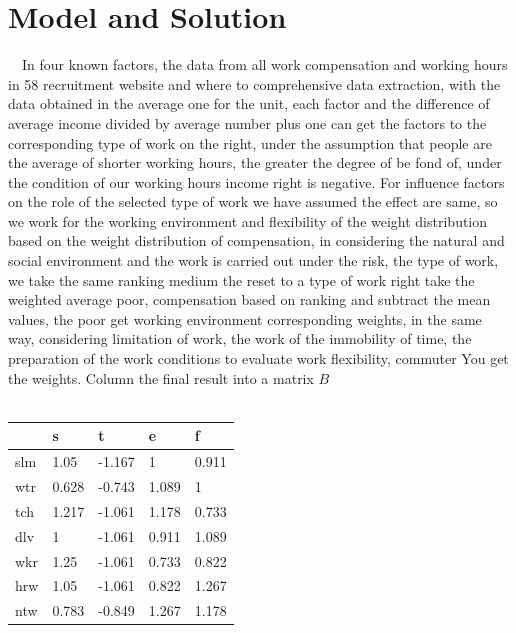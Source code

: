 \documentclass[12pt]{article}
\begin{document}
\section{Model and Solution}
~~In four known factors, the data from all work compensation and working hours in 58 recruitment website and where to comprehensive data extraction, with the data obtained in the average one for the unit, each factor and the difference of average income divided by average number plus one can get the factors to the corresponding type of work on the right, under the assumption that people are the average of shorter working hours, the greater the degree of be fond of, under the condition of our working hours income right is negative. For influence factors on the role of the selected type of work we have assumed the effect are same, so we work for the working environment and flexibility of the weight distribution based on the weight distribution of compensation, in considering the natural and social environment and the work is carried out under the risk, the type of work, we take the same ranking medium the reset to a type of work right take the weighted average poor, compensation based on ranking and subtract the mean values, the poor get working environment corresponding weights, in the same way, considering limitation of work, the work of the immobility of time, the preparation of the work conditions to evaluate work flexibility, commuter You get the weights. Column the final result into a matrix $B$\\%
~~\begin{table}[htp]
    \begin{tabular}{lllll}
                                   & s    & t   & e  & f \\
        \hline
    slm                       & 1.05  & -1.167 & 1     & 0.911 \\
    wtr                         & 0.628 & -0.743 & 1.089 & 1     \\
    tch                & 1.217 & -1.061 & 1.178 & 0.733 \\
    dlv                   & 1     & -1.061 & 0.911 & 1.089 \\
    wkr & 1.25  & -1.061 & 0.733 & 0.822 \\
    hrw                  & 1.05  & -1.061 & 0.822 & 1.267 \\
    ntw       & 0.783 & -0.849 & 1.267 & 1.178
    \end{tabular}
\end{table}
\end{document}
